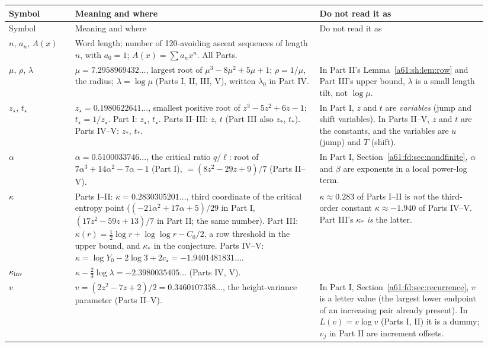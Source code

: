 \documentclass[11pt,letterpaper]{article}
\numberwithin{equation}{section}
\theoremstyle{remark}\newtheorem{remark}[theorem]{Remark}
\newcommand{\st}{\star}
\begin{document}
{\small
\begin{longtable}{@{}>{\raggedright\arraybackslash}p{0.13\linewidth}>{\raggedright\arraybackslash}p{0.48\linewidth}>{\raggedright\arraybackslash}p{0.33\linewidth}@{}}
\toprule
Symbol & Meaning and where & Do not read it as\\
\midrule
\endfirsthead
\toprule
Symbol & Meaning and where & Do not read it as\\
\midrule
\endhead
\bottomrule
\endfoot
$n$, $a_n$, $A(x)$ & Word length; number of 120-avoiding ascent sequences of length $n$, with $a_0=1$; $A(x)=\sum a_nx^n$. All Parts. & \\
$\mu$, $\rho$, $\lambda$ & $\mu=7.2958969432\ldots$, largest root of $\mu^3-8\mu^2+5\mu+1$; $\rho=1/\mu$, the radius; $\lambda=\log\mu$ (Parts I, II, III, V), written $\lambda_0$ in Part IV. & In Part II's Lemma~\ref{a61:sh:lem:row} and Part III's upper bound, $\lambda$ is a small length tilt, not $\log\mu$.\\
$z_\star$, $t_\star$ & $z_\star=0.1980622641\ldots$, smallest positive root of $z^3-5z^2+6z-1$; $t_\star=1/z_\star$. Part I: $z_\st$, $t_\st$. Parts II--III: $z$, $t$ (Part III also $z_*$, $t_*$). Parts IV--V: $z_*$, $t_*$. & In Part I, $z$ and $t$ are \emph{variables} (jump and shift variables). In Parts II--V, $z$ and $t$ are the constants, and the variables are $u$ (jump) and $T$ (shift).\\
$\alpha$ & $\alpha=0.5100033746\ldots$, the critical ratio $q/\ell$: root of $7\alpha^3+14\alpha^2-7\alpha-1$ (Part I), $=(8z^2-29z+9)/7$ (Parts II--V). & In Part I, Section~\ref{a61:fd:sec:nondfinite}, $\alpha$ and $\beta$ are exponents in a local power-log term.\\
$\kappa$ & Parts I--II: $\kappa=0.2830305201\ldots$, third coordinate of the critical entropy point ($(-21\alpha^2+17\alpha+5)/29$ in Part I, $(17z^2-59z+13)/7$ in Part II; the same number). Part III: $\kappa(r)=\frac12\log r+\log\log r-C_0/2$, a row threshold in the upper bound, and $\kappa_*$ in the conjecture. Parts IV--V: $\kappa=\log Y_0-2\log3+2c_\star=-1.9401481831\ldots$. & $\kappa\approx0.283$ of Parts I--II is \emph{not} the third-order constant $\kappa\approx-1.940$ of Parts IV--V. Part III's $\kappa_*$ \emph{is} the latter.\\
$\kappa_{\rm inv}$ & $\kappa-\frac23\log\lambda=-2.3980035405\ldots$ (Parts IV, V). & \\
$v$ & $v=(2z^2-7z+2)/2=0.3460107358\ldots$, the height-variance parameter (Parts II--V). & In Part I, Section~\ref{a61:fd:sec:recurrence}, $v$ is a letter value (the largest lower endpoint of an increasing pair already present). In $L(v)=v\log v$ (Parts I, II) it is a dummy; $v_j$ in Part II are increment offsets.\\

\end{longtable}}
\end{document}
